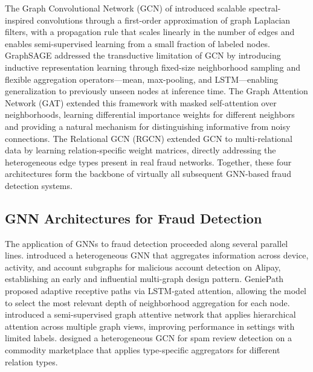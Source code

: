 The Graph Convolutional Network (GCN) of \cite{kipf2017semi} introduced scalable
spectral-inspired convolutions through a first-order approximation of graph Laplacian
filters, with a propagation rule that scales linearly in the number of edges and enables
semi-supervised learning from a small fraction of labeled nodes. GraphSAGE
\cite{hamilton2017inductive} addressed the transductive limitation of GCN by introducing
inductive representation learning through fixed-size neighborhood sampling and flexible
aggregation operators—mean, max-pooling, and LSTM—enabling generalization to previously
unseen nodes at inference time. The Graph Attention Network (GAT) \cite{velickovic2018graph}
extended this framework with masked self-attention over neighborhoods, learning
differential importance weights for different neighbors and providing a natural mechanism
for distinguishing informative from noisy connections. The Relational GCN (RGCN)
\cite{schlichtkrull2018modeling} extended GCN to multi-relational data by learning
relation-specific weight matrices, directly addressing the heterogeneous edge types
present in real fraud networks. Together, these four architectures form the backbone of
virtually all subsequent GNN-based fraud detection systems.

\subsection{GNN Architectures for Fraud Detection}

The application of GNNs to fraud detection proceeded along several parallel lines.
\cite{liu2018heterogeneous} introduced a heterogeneous GNN that aggregates information
across device, activity, and account subgraphs for malicious account detection on
Alipay, establishing an early and influential multi-graph design pattern. GeniePath
\cite{liu2019geniepath} proposed adaptive receptive paths via LSTM-gated attention,
allowing the model to select the most relevant depth of neighborhood aggregation for each
node. \cite{wang2019semignn} introduced a semi-supervised graph attentive network that
applies hierarchical attention across multiple graph views, improving performance in
settings with limited labels. \cite{li2019spam} designed a heterogeneous GCN for spam
review detection on a commodity marketplace that applies type-specific aggregators for
different relation types.

